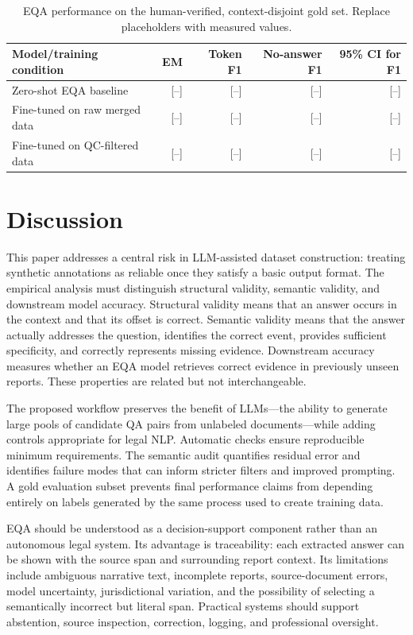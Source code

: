 \documentclass[graybox]{SNmult}
\begin{document}
\begin{table}[!t]
\caption{EQA performance on the human-verified, context-disjoint gold set. Replace placeholders with measured values.}
\label{tab:model-results}
\centering
\small
\begin{tabular}{lrrrr}
\toprule
Model/training condition & EM & Token F1 & No-answer F1 & 95\% CI for F1 \\
\midrule
Zero-shot EQA baseline & [--] & [--] & [--] & [--] \\
Fine-tuned on raw merged data & [--] & [--] & [--] & [--] \\
Fine-tuned on QC-filtered data & [--] & [--] & [--] & [--] \\
\bottomrule
\end{tabular}
\end{table}

\section{Discussion}
\label{sec:discussion}

This paper addresses a central risk in LLM-assisted dataset construction: treating synthetic annotations as reliable once they satisfy a basic output format. The empirical analysis must distinguish structural validity, semantic validity, and downstream model accuracy. Structural validity means that an answer occurs in the context and that its offset is correct. Semantic validity means that the answer actually addresses the question, identifies the correct event, provides sufficient specificity, and correctly represents missing evidence. Downstream accuracy measures whether an EQA model retrieves correct evidence in previously unseen reports. These properties are related but not interchangeable.

The proposed workflow preserves the benefit of LLMs---the ability to generate large pools of candidate QA pairs from unlabeled documents---while adding controls appropriate for legal NLP. Automatic checks ensure reproducible minimum requirements. The semantic audit quantifies residual error and identifies failure modes that can inform stricter filters and improved prompting. A gold evaluation subset prevents final performance claims from depending entirely on labels generated by the same process used to create training data.

EQA should be understood as a decision-support component rather than an autonomous legal system. Its advantage is traceability: each extracted answer can be shown with the source span and surrounding report context. Its limitations include ambiguous narrative text, incomplete reports, source-document errors, model uncertainty, jurisdictional variation, and the possibility of selecting a semantically incorrect but literal span. Practical systems should support abstention, source inspection, correction, logging, and professional oversight.
\end{document}
